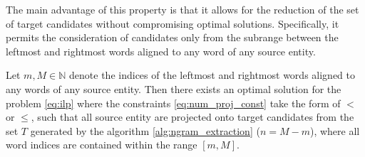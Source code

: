The main advantage of this property is that it allows for the reduction of the set of
target candidates without compromising optimal solutions. Specifically, it permits
the consideration of candidates only from the subrange between the leftmost and
rightmost words aligned to any word of any source entity.
\begin{theorem} \label{thm:reduce_T_for_align}
  Let \( m, M \in \mathbb{N} \) denote the indices of the leftmost and rightmost words aligned
  to any words of any source entity. Then there exists
  an optimal solution for the problem \eqref{eq:ilp} where the constraints
  \eqref{eq:num_proj_const} take the form of \( < \) or \( \leq \), such that
  all source entity are projected onto target candidates from the set \( T \)
  generated by the algorithm \ref{alg:ngram_extraction} (\( n = M - m \)), where all word indices
  are contained within the range \( [m, M] \).
\end{theorem}
